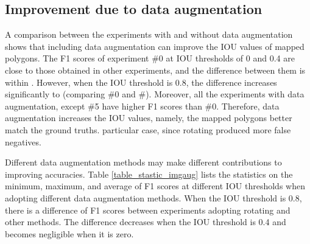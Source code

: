 \documentclass[authoryear,preprint,review,12pt]{elsarticle}
\begin{document}


\subsection{Improvement due to data augmentation}
\label{subsec_contrib_dataAug}

A comparison between the experiments with and without data augmentation shows that including data augmentation can improve the IOU values of mapped polygons.  The F1 scores of experiment \#0 at IOU thresholds of 0 and 0.4 are close to those obtained in other experiments, and the difference between them is within . 
However, when the IOU threshold is 0.8, the difference increases significantly to  (comparing \#0 and \#). Moreover, all the experiments with data augmentation, except \#5 have higher F1 scores than \#0.  Therefore, data augmentation increases the IOU values, namely, the mapped polygons better match the ground truths.  particular case, since rotating produced more false negatives. 


Different data augmentation methods may make different contributions to improving accuracies. Table \ref{table_stastic_imgaug} lists the statistics on the minimum, maximum, and average of F1 scores at different IOU thresholds when adopting different data augmentation methods. 
When the IOU threshold is 0.8, there is a difference of F1 scores between experiments adopting rotating and other methods. The difference decreases when the IOU threshold is 0.4 and becomes negligible when it is zero. 
\end{document}
